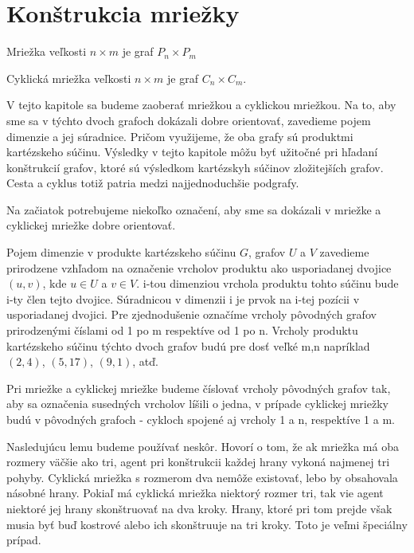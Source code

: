 \chapter{Konštrukcia mriežky}
\begin{defin}
Mriežka veľkosti $ n \times m$ je graf $P_{n} \times P_{m}$
\end{defin}
\begin{defin}
Cyklická mriežka veľkosti $n \times m$ je graf $C_{n} \times C_{m}$.
\end{defin}

V tejto kapitole sa budeme zaoberať mriežkou a cyklickou mriežkou. Na to, aby sme sa v
týchto dvoch grafoch dokázali dobre orientovať, zavedieme pojem dimenzie a
jej súradnice. Pričom využijeme, že oba grafy sú produktmi kartézskeho
súčinu. Výsledky v tejto kapitole môžu byť užitočné pri hľadaní konštrukcií
grafov, ktoré sú výsledkom kartézskyh súčinov zložitejších grafov. Cesta a
cyklus totiž patria medzi najjednoduchšie podgrafy.

Na začiatok potrebujeme niekoľko označení, aby sme sa dokázali v mriežke a
cyklickej mriežke dobre orientovať.

\begin{ozn}
Pojem dimenzie v produkte kartézskeho súčinu $G$, grafov $U$ a $V$ 
zavedieme prirodzene vzhľadom
na označenie vrcholov produktu ako usporiadanej dvojice $(u,v)$, kde $u \in
U$ a $v \in V$. i-tou dimenziou vrchola produktu tohto súčinu bude i-ty člen
tejto dvojice. Súradnicou v dimenzii i je prvok na i-tej pozícii v
usporiadanej dvojici. Pre zjednodušenie označíme vrcholy pôvodných grafov
prirodzenými číslami od 1 po m respektíve od 1 po n. Vrcholy produktu
kartézskeho súčinu týchto dvoch grafov budú pre dosť veľké m,n napríklad
$(2,4)$, $(5,17)$, $(9,1)$, atď.
\end{ozn}

\begin{pozn}
Pri mriežke a cyklickej mriežke budeme číslovať vrcholy pôvodných grafov
tak, aby sa označenia susedných vrcholov líšili o jedna, v prípade cyklickej
mriežky budú v pôvodných grafoch - cykloch spojené aj vrcholy 1 a n,
respektíve 1 a m.
\end{pozn}

Nasledujúcu lemu budeme používať neskôr. Hovorí o tom, že ak mriežka má oba
rozmery väčšie ako tri, agent pri konštrukcii každej hrany vykoná najmenej
tri pohyby. Cyklická mriežka s rozmerom dva nemôže existovať, lebo by
obsahovala násobné hrany. Pokiaľ má cyklická mriežka niektorý rozmer tri,
tak vie agent niektoré jej hrany skonštruovať na dva kroky. Hrany, 
ktoré pri tom
prejde však musia byť buď kostrové alebo ich skonštruuje na tri kroky. Toto
je veľmi špeciálny prípad.

